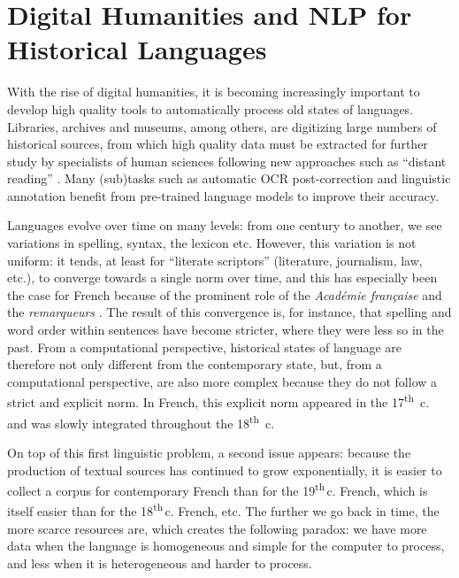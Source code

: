 \section{Digital Humanities and NLP for Historical Languages}

With the rise of digital humanities, it is becoming increasingly important to develop high quality tools to automatically process old states of languages. Libraries, archives and museums, among others, are digitizing large numbers of historical sources, from which high quality data must be extracted for further study by specialists of human sciences following new approaches such as ``distant reading'' \citep{moretti-2013-distant}. Many (sub)tasks such as automatic OCR post-correction \citep{rijhwani-etal-2021-lexically} and linguistic annotation \citep{camps-etal-2021-corpus} benefit from pre-trained language models to improve their accuracy.

Languages evolve over time on many levels: from one century to another, we see variations in spelling, syntax, the lexicon etc. However, this variation is not uniform: it tends, at least for ``literate scriptors'' (literature, journalism, law, etc.), to converge towards a single norm over time, and this has especially been the case for French because of the prominent role of the \emph{Académie française} and the \emph{remarqueurs} \citep{ayres-bennett-etal-2011-remarques}. The result of this convergence is, for instance, that spelling and word order within sentences have become stricter, where they were less so in the past. From a computational perspective, historical states of language are therefore not only different from the contemporary state, but, from a computational perspective, are also more complex because they do not follow a strict and explicit norm. In French, this explicit norm  appeared in the 17\textsuperscript{th}~c. and was slowly integrated throughout the 18\textsuperscript{th}~c.

On top of this first linguistic problem, a second issue appears: because the production of textual sources has continued to grow exponentially, it is easier to collect a corpus for contemporary French  than for the 19\textsuperscript{th}\,c. French, which is itself easier than for the 18\textsuperscript{th}\,c. French, etc. The further we go back in time, the more scarce resources are, which creates the following paradox: we have more data when the language is homogeneous and simple for the computer to process, and less when it is heterogeneous and harder to process.

